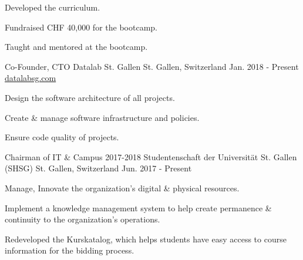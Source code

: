 \begin{cventries}
{\begin{cvitems}
      \item {Developed the curriculum.}
      \item {Fundraised CHF 40,000 for the bootcamp.}
      \item {Taught and mentored at the bootcamp.}
      \end{cvitems}
    }
  \cventry
    {Co-Founder, CTO} %
    {Datalab St. Gallen} %
    {St. Gallen, Switzerland} %
    {Jan. 2018 - Present} %
    {\href{https://datalabsg.com}{datalabsg.com}} %
    {
      \begin{cvitems} %
      \item {Design the software architecture of all projects.}
      \item {Create \& manage software infrastructure and policies.}
      \item {Ensure code quality of projects.}
      \end{cvitems}
    }
  \cventry
    {Chairman of IT \& Campus 2017-2018} %
    {Studentenschaft der Universität St. Gallen (SHSG)} %
    {St. Gallen, Switzerland} %
    {Jun. 2017 - Present} %
    {} %
    {
      \begin{cvitems} %
        \item {Manage, Innovate the organization's digital \& physical resources.}
        \item {Implement a knowledge management system to help create permanence \& continuity to the organization's operations.}
        \item {Redeveloped the Kurskatalog, which helps students have easy access to course information for the bidding process.}
      \end{cvitems}
    }

\end{cventries}
